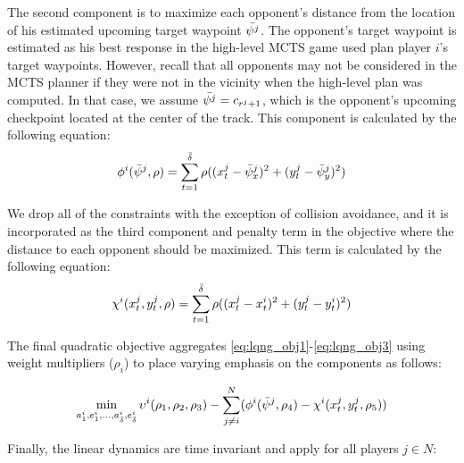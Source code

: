 The second component is to maximize each opponent's distance from the location of his estimated upcoming target waypoint $\Bar{\psi^j}$. The opponent's target waypoint is estimated as his best response in the high-level MCTS game used plan player $i$'s target waypoints. However, recall that all opponents may not be considered in the MCTS planner if they were not in the vicinity when the high-level plan was computed. In that case, we assume $\Bar{\psi^j} = c_{r^j + 1}$, which is the opponent's upcoming checkpoint located at the center of the track. This component is calculated by the following equation:
\begin{equation} \label{eq:lqng_obj2}
    \phi^i(\Bar{\psi}^j, \rho) = \sum_{t = 1}^{\Bar{\delta}} \rho((x^j_{t} - \Bar{\psi}^j_x)^2 + (y^j_{t} - \Bar{\psi}^j_y)^2)
\end{equation}

We drop all of the constraints with the exception of collision avoidance, and it is incorporated as the third component and penalty term in the objective where the distance to each opponent should be maximized. This term is calculated by the following equation:
\begin{equation} \label{eq:lqng_obj3}
    \chi^i(x^j_t, y^j_t, \rho) = \sum_{t = 1}^{\Bar{\delta}} \rho((x^j_{t} - x^i_{t})^2 + (y^j_{t} - y^i_{t})^2)
\end{equation}

The final quadratic objective aggregates \eqref{eq:lqng_obj1}-\eqref{eq:lqng_obj3} using weight multipliers ($\rho_i$) to place varying emphasis on the components as follows:

\begin{equation} \label{eq:lqng_obj}
    \min_{a^i_{1}, e^i_{1}, ..., a^i_{\Bar{\delta}}, e^i_{\Bar{\delta}}}
    \upsilon^i(\rho_1, \rho_2,\rho_3)
    -\sum_{j \neq i}^{N}  (\phi^i(\Bar{\psi}^j, \rho_4) - \chi^i(x^j_t, y^j_t, \rho_5))
\end{equation}

Finally, the linear dynamics are time invariant and apply for all players $j \in N$:

